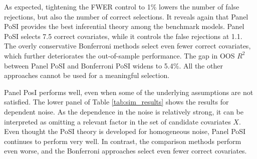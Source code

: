 \documentclass[11pt]{article}
\newcommand{\iid}{\stackrel{iid}{\sim}}
\begin{document}
	As expected, tightening the FWER control to 1\% lowers the number of false rejections, but also the number of correct selections. It reveals again that Panel PoSI provides the best inferential theory among the benchmark models. Panel PoSI selects 7.5 correct covariates, while it controls the false rejections at 1.1. The overly conservative Bonferroni methods select even fewer correct covariates, which further deteriorates the out-of-sample performance. The gap in OOS $R^2$ between Panel PoSI and Bonferroni PoSI widens to 5.4\%. All the other approaches cannot be used for a meaningful selection.
	
	Panel PosI performs well, even when some of the underlying assumptions are not satisfied. The lower panel of Table \ref{tab:sim_results} shows the results for dependent noise. As the dependence in the noise is relatively strong, it can be interpreted as omitting a relevant factor in the set of candidate covariates $X$. Even thought the PoSI theory is developed for homogeneous noise, Panel PoSI continues to perform very well. In contrast, the comparison methods perform even worse, and the Bonferroni approaches select even fewer correct covariates.
	
	
	
	
	
	
	
	
	
	
	
	
\end{document}
